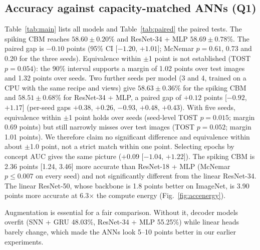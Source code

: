 \documentclass[conference]{IEEEtran}
\begin{document}
\subsection{Accuracy against capacity-matched ANNs (Q1)}
Table~\ref{tab:main} lists all models and Table~\ref{tab:paired} the paired tests. The spiking CBM reaches $58.60\pm0.20$\% and ResNet-34 + MLP $58.69\pm0.78$\%. The paired gap is $-0.10$ points (95\% CI [$-1.20$, $+1.01$]; McNemar $p=0.61$, 0.73 and 0.20 for the three seeds). Equivalence within $\pm$1 point is not established (TOST $p=0.054$): the 90\% interval supports a margin of 1.02 points over test images and 1.32 points over seeds. Two further seeds per model (3 and 4, trained on a CPU with the same recipe and views) give $58.63\pm0.36$\% for the spiking CBM and $58.51\pm0.68$\% for ResNet-34 + MLP, a paired gap of $+0.12$ points [$-0.92$, $+1.17$] (per-seed gaps $+0.38$, $+0.26$, $-0.93$, $+0.48$, $+0.43$). With five seeds, equivalence within $\pm$1 point holds over seeds (seed-level TOST $p=0.015$; margin 0.69 points) but still narrowly misses over test images (TOST $p=0.052$; margin 1.01 points). We therefore claim no significant difference and equivalence within about $\pm$1.0 point, not a strict match within one point. Selecting epochs by concept AUC gives the same picture ($+0.09$ [$-1.04$, $+1.22$]). The spiking CBM is 2.36 points [1.24, 3.46] more accurate than ResNet-18 + MLP (McNemar $p\le0.007$ on every seed) and not significantly different from the linear ResNet-34. The linear ResNet-50, whose backbone is 1.8 points better on ImageNet, is 3.90 points more accurate at 6.3$\times$ the compute energy (Fig.~\ref{fig:accenergy}).

Augmentation is essential for a fair comparison. Without it, decoder models overfit (SNN + GRU 48.03\%, ResNet-34 + MLP 55.25\%) while linear heads barely change, which made the ANNs look 5--10 points better in our earlier experiments.
\end{document}
